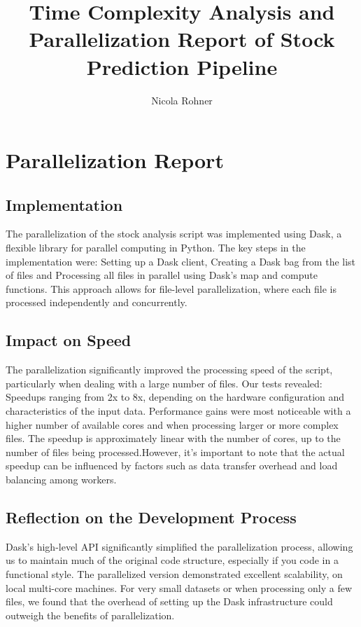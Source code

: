 \documentclass[11pt,a4paper]{article}
\title{Time Complexity Analysis and Parallelization Report of Stock Prediction Pipeline}
\author{Nicola Rohner}
\begin{document}
\maketitle

\section{Parallelization Report}

\subsection{Implementation}
The parallelization of the stock analysis script was implemented using Dask, a flexible library for parallel computing in Python. The key steps in the implementation were:
Setting up a Dask client, Creating a Dask bag from the list of files and Processing all files in parallel using Dask's map and compute functions.
This approach allows for file-level parallelization, where each file is processed independently and concurrently.

\subsection{Impact on Speed}
The parallelization significantly improved the processing speed of the script, particularly when dealing with a large number of files. Our tests revealed:
Speedups ranging from 2x to 8x, depending on the hardware configuration and characteristics of the input data.
Performance gains were most noticeable with a higher number of available cores and when processing larger or more complex files.
The speedup is approximately linear with the number of cores, up to the number of files being processed.However, it's important to note that the actual speedup can be influenced by factors such as data transfer overhead and load balancing among workers.

\subsection{Reflection on the Development Process}
Dask's high-level API significantly simplified the parallelization process, allowing us to maintain much of the original code structure, especially if you code in a functional style.
The parallelized version demonstrated excellent scalability, on local multi-core machines.
For very small datasets or when processing only a few files, we found that the overhead of setting up the Dask infrastructure could outweigh the benefits of parallelization. 
\end{document}
